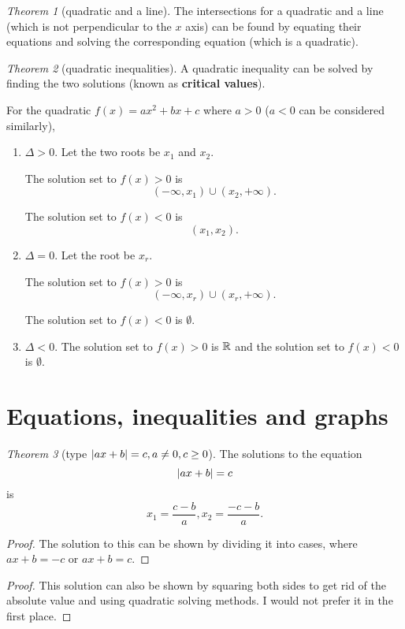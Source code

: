 \documentclass[8pt]{article}
\theoremstyle{remark}
\newtheorem{theorem}{Theorem}[section]
\begin{document}
        \begin{theorem}[quadratic and a line]
            The intersections for a quadratic and a line (which is not perpendicular to the $x$ axis) can be found by equating their equations and solving the corresponding equation (which is a quadratic).
        \end{theorem}

        \begin{theorem}[quadratic inequalities]
            A quadratic inequality can be solved by finding the two solutions (known as \textbf{critical values}).

            For the quadratic $f(x) = ax^2 + bx + c$ where $a > 0$ ($a < 0$ can be considered similarly),
            \begin{enumerate}
                \item $\Delta > 0$. Let the two roots be $x_1$ and $x_2$.
                
                The solution set to $f(x) > 0$ is
                $$
                    (-\infty, x_1) \cup (x_2, +\infty).
                $$

                The solution set to $f(x) < 0$ is
                $$
                    (x_1, x_2).
                $$

                \item $\Delta = 0$. Let the root be $x_r$.
                
                The solution set to $f(x) > 0$ is
                $$
                    (-\infty, x_r) \cup (x_r, +\infty).
                $$

                The solution set to $f(x) < 0$ is $\emptyset$.

                \item $\Delta < 0$. The solution set to $f(x) > 0$ is $\mathbb{R}$ and the solution set to $f(x) < 0$ is $\emptyset$.
            \end{enumerate}
        \end{theorem}

    \section{Equations, inequalities and graphs}
        \begin{theorem}[type $\left\lvert ax + b \right\rvert = c, a \neq 0, c \geq 0$]
            The solutions to the equation
            $$
                \left\lvert ax + b \right\rvert = c
            $$
            is
            $$
                x_1 = \frac{c - b}{a}, x_2 = \frac{-c -b}{a}.
            $$

            \begin{proof}
                The solution to this can be shown by dividing it into cases, where $ax + b = -c$ or $ax + b = c$.
            \end{proof}

            \begin{proof}
                This solution can also be shown by squaring both sides to get rid of the absolute value and using quadratic solving methods. I would not prefer it in the first place.
            \end{proof}
        \end{theorem}
\end{document}
